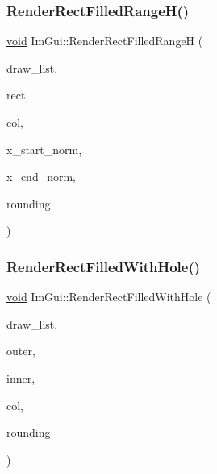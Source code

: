 \subsubsection{\texorpdfstring{Render\+Rect\+Filled\+Range\+H()}{RenderRectFilledRangeH()}}
{\footnotesize\ttfamily \hyperlink{imgui__impl__opengl3__loader_8h_ac668e7cffd9e2e9cfee428b9b2f34fa7}{void} Im\+Gui\+::\+Render\+Rect\+Filled\+RangeH (\begin{DoxyParamCaption}\item[{\hyperlink{structImDrawList}{Im\+Draw\+List} $\ast$}]{draw\+\_\+list,  }\item[{const \hyperlink{structImRect}{Im\+Rect} \&}]{rect,  }\item[{Im\+U32}]{col,  }\item[{float}]{x\+\_\+start\+\_\+norm,  }\item[{float}]{x\+\_\+end\+\_\+norm,  }\item[{float}]{rounding }\end{DoxyParamCaption})}

\mbox{\label{namespaceImGui_a3579615f926c34c5de220f655d535d61}} 
\subsubsection{\texorpdfstring{Render\+Rect\+Filled\+With\+Hole()}{RenderRectFilledWithHole()}}
{\footnotesize\ttfamily \hyperlink{imgui__impl__opengl3__loader_8h_ac668e7cffd9e2e9cfee428b9b2f34fa7}{void} Im\+Gui\+::\+Render\+Rect\+Filled\+With\+Hole (\begin{DoxyParamCaption}\item[{\hyperlink{structImDrawList}{Im\+Draw\+List} $\ast$}]{draw\+\_\+list,  }\item[{const \hyperlink{structImRect}{Im\+Rect} \&}]{outer,  }\item[{const \hyperlink{structImRect}{Im\+Rect} \&}]{inner,  }\item[{Im\+U32}]{col,  }\item[{float}]{rounding }\end{DoxyParamCaption})}

\mbox{\label{namespaceImGui_a9971ce57f2a288ac3a12df886c5550d1}} 
